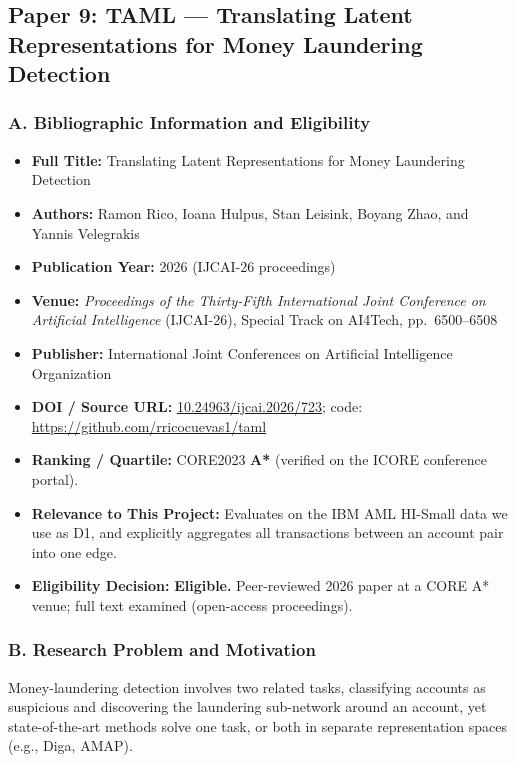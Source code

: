 \documentclass[11pt,a4paper]{article}
\begin{document}
\subsection{Paper 9: TAML --- Translating Latent Representations for Money Laundering Detection}
\label{sec:p9_taml}

\subsubsection*{A. Bibliographic Information and Eligibility}
\begin{itemize}[leftmargin=*]
    \item \textbf{Full Title:} Translating Latent Representations for Money Laundering Detection
    \item \textbf{Authors:} Ramon Rico, Ioana Hulpus, Stan Leisink, Boyang Zhao, and Yannis Velegrakis
    \item \textbf{Publication Year:} 2026 (IJCAI-26 proceedings)
    \item \textbf{Venue:} \textit{Proceedings of the Thirty-Fifth International Joint Conference on Artificial Intelligence} (IJCAI-26), Special Track on AI4Tech, pp.~6500--6508
    \item \textbf{Publisher:} International Joint Conferences on Artificial Intelligence Organization
    \item \textbf{DOI / Source URL:} \href{https://doi.org/10.24963/ijcai.2026/723}{10.24963/ijcai.2026/723}; code: \url{https://github.com/rricocuevas1/taml}
    \item \textbf{Ranking / Quartile:} CORE2023 \textbf{A*} (verified on the ICORE conference portal).
    \item \textbf{Relevance to This Project:} Evaluates on the IBM AML HI-Small data we use as D1, and explicitly aggregates all transactions between an account pair into one edge.
    \item \textbf{Eligibility Decision:} \textbf{Eligible.} Peer-reviewed 2026 paper at a CORE A* venue; full text examined (open-access proceedings).
\end{itemize}

\subsubsection*{B. Research Problem and Motivation}
Money-laundering detection involves two related tasks, classifying accounts as suspicious and discovering the laundering sub-network around an account, yet state-of-the-art methods solve one task, or both in separate representation spaces (e.g., Diga, AMAP).
\end{document}
